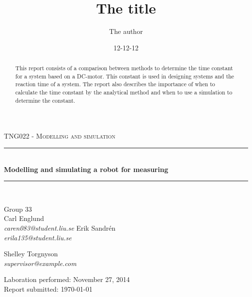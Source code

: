\documentclass[12pt,a4paper]{article}
\newcommand{\HRule}{\rule{\linewidth}{0.5mm}}
\begin{document}
\title{The title}
\author{The author}
\date{12-12-12}

\begin{titlepage}
\begin{center}

\textsc{TNG022 - Modelling and simulation }\\[0.5cm]

\HRule \\[0.4cm]
{ \huge \bfseries Modelling and simulating a robot for measuring \\[0.4cm] }

\HRule \\[1.5cm]

\begin{minipage}{0.4\textwidth}
\begin{flushleft} \large
Group 33\\
Carl Englund\\
\emph{caren083@student.liu.se}
Erik Sandrén\\
\emph{erila135@student.liu.se}
\end{flushleft}
\end{minipage}
\begin{minipage}{0.4\textwidth}
\begin{flushright} \large
Shelley Torgnyson\\
\emph{supervisor@example.com}
\end{flushright}
\end{minipage}

\vfill

{\large Laboration performed: November 27, 2014\\}
{\large Report submitted: \today}

\end{center}
\end{titlepage}

\newpage\null\thispagestyle{empty}\newpage

\newpage{} %

\begin{abstract}
This report consists of a comparison between methods to determine the time constant for a system based on a DC-motor. This constant is used in designing systems and the reaction time of a system. The report also describes the importance of when to calculate the time constant by the analytical method and when to use a simulation to determine the constant.
\end{abstract}
\end{document}
